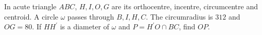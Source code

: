 In acute triangle $ABC$, $H,I,O,G$ are its orthocentre, incentre, circumcentre and centroid. A circle $\omega$ passes through $B,I,H,C$. The circumradius is $312$ and $OG=80$. If $HH^{\prime}$ is a diameter of $\omega$ and $P=H^{\prime}O\cap BC$, find $OP$.
